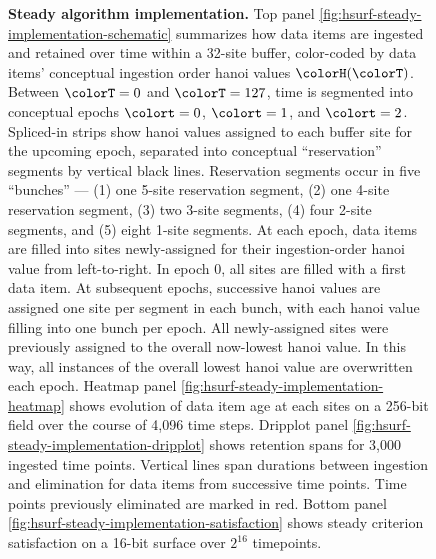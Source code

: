 \begin{figure}[h!]
\vspace{-2ex}\caption{%
  \textbf{Steady algorithm implementation.}
  \footnotesize
  Top panel \ref{fig:hsurf-steady-implementation-schematic} summarizes how data items are ingested and retained over time within a 32-site buffer, color-coded by data items' conceptual ingestion order hanoi values $\colorH(\colorT)$.
  Between $\colorT=0$ and $\colorT=127$, time is segmented into conceptual epochs $\colort=0$, $\colort=1$, and $\colort=2$.
  Spliced-in strips show hanoi values assigned to each buffer site for the upcoming epoch, separated into conceptual ``reservation'' segments by vertical black lines.
  Reservation segments occur in five ``bunches'' --- (1) one 5-site reservation segment, (2) one 4-site reservation segment, (3) two 3-site segments, (4) four 2-site segments, and (5) eight 1-site segments.
  At each epoch, data items are filled into sites newly-assigned for their ingestion-order hanoi value from left-to-right.
  In epoch 0, all sites are filled with a first data item.
  At subsequent epochs, successive hanoi values are assigned one site per segment in each bunch, with each hanoi value filling into one bunch per epoch.
  All newly-assigned sites were previously assigned to the overall now-lowest hanoi value.
  In this way, all instances of the overall lowest hanoi value are overwritten each epoch.
  Heatmap panel \ref{fig:hsurf-steady-implementation-heatmap} shows evolution of data item age at each sites on a 256-bit field over the course of 4,096 time steps.
  Dripplot panel \ref{fig:hsurf-steady-implementation-dripplot} shows retention spans for 3,000 ingested time points.
  Vertical lines span durations between ingestion and elimination for data items from successive time points.
  Time points previously eliminated are marked in red.
  Bottom panel \ref{fig:hsurf-steady-implementation-satisfaction} shows steady criterion satisfaction on a 16-bit surface over $2^{16}$ timepoints.
  }
\label{fig:hsurf-steady-implementation}

\end{figure}
